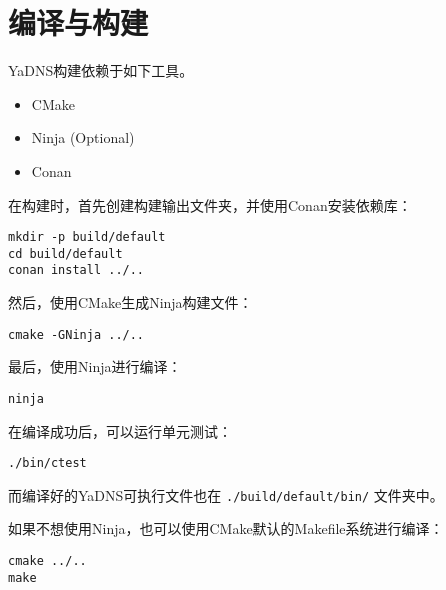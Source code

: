 \section{编译与构建}

YaDNS构建依赖于如下工具。
\begin{itemize}
  \item CMake
  \item Ninja (Optional)
  \item Conan
\end{itemize}

在构建时，首先创建构建输出文件夹，并使用Conan安装依赖库：
\begin{verbatim}
mkdir -p build/default
cd build/default
conan install ../..
\end{verbatim}

然后，使用CMake生成Ninja构建文件：
\begin{verbatim}
cmake -GNinja ../..
\end{verbatim}

最后，使用Ninja进行编译：
\begin{verbatim}
ninja
\end{verbatim}

在编译成功后，可以运行单元测试：
\begin{verbatim}
./bin/ctest
\end{verbatim}
而编译好的YaDNS可执行文件也在 \texttt{./build/default/bin/} 文件夹中。

如果不想使用Ninja，也可以使用CMake默认的Makefile系统进行编译：
\begin{verbatim}
cmake ../..
make
\end{verbatim}
